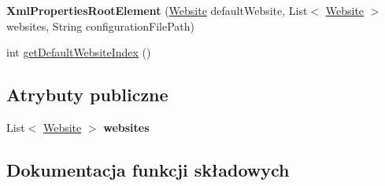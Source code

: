 \begin{DoxyCompactItemize}
\item 
\hypertarget{classpl_1_1edu_1_1uwb_1_1mobiuwb_1_1parsers_1_1xml_1_1model_1_1_xml_properties_root_element_af085583a7d7b69e4f60583b2c8c6bbc7}{}{\bfseries Xml\+Properties\+Root\+Element} (\hyperlink{classpl_1_1edu_1_1uwb_1_1mobiuwb_1_1parsers_1_1xml_1_1model_1_1_website}{Website} default\+Website, List$<$ \hyperlink{classpl_1_1edu_1_1uwb_1_1mobiuwb_1_1parsers_1_1xml_1_1model_1_1_website}{Website} $>$ websites, String configuration\+File\+Path)\label{classpl_1_1edu_1_1uwb_1_1mobiuwb_1_1parsers_1_1xml_1_1model_1_1_xml_properties_root_element_af085583a7d7b69e4f60583b2c8c6bbc7}

\item 
int \hyperlink{classpl_1_1edu_1_1uwb_1_1mobiuwb_1_1parsers_1_1xml_1_1model_1_1_xml_properties_root_element_ac01847e32b879f22846d03fd6857fbd5}{get\+Default\+Website\+Index} ()
\end{DoxyCompactItemize}
\subsection*{Atrybuty publiczne}
\begin{DoxyCompactItemize}
\item 
\hypertarget{classpl_1_1edu_1_1uwb_1_1mobiuwb_1_1parsers_1_1xml_1_1model_1_1_xml_properties_root_element_a2a2902a7271325ecb95d46e0349e8438}{}List$<$ \hyperlink{classpl_1_1edu_1_1uwb_1_1mobiuwb_1_1parsers_1_1xml_1_1model_1_1_website}{Website} $>$ {\bfseries websites}\label{classpl_1_1edu_1_1uwb_1_1mobiuwb_1_1parsers_1_1xml_1_1model_1_1_xml_properties_root_element_a2a2902a7271325ecb95d46e0349e8438}

\end{DoxyCompactItemize}


\subsection{Dokumentacja funkcji składowych}
\hypertarget{classpl_1_1edu_1_1uwb_1_1mobiuwb_1_1parsers_1_1xml_1_1model_1_1_xml_properties_root_element_ac01847e32b879f22846d03fd6857fbd5}{}
